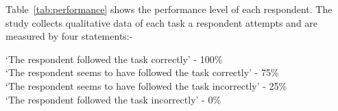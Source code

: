 Table~\ref{tab:performance} shows the performance level of each respondent. The study collects qualitative data of each task a respondent attempts and are measured by four statements:-
\begin{center}
    `The respondent followed the task correctly' - 100\%\\
    `The respondent seems to have followed the task correctly' - 75\%\\
    `The respondent seems to have followed the task incorrectly' - 25\%\\
    `The respondent followed the task incorrectly' - 0\%
\end{center}
%
\begin{center}\vspace{1cm}
    \label{tab:performance}
\end{center}
%



